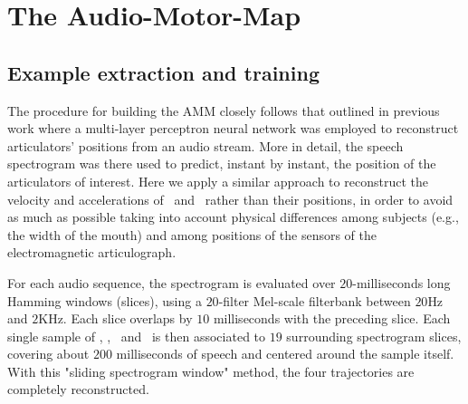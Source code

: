 \section{The Audio-Motor-Map}
\label{sec:rec}

\subsection{Example extraction and training}
\label{subsec:amm_setup}

The procedure for building the AMM closely follows that outlined in previous
work \cite{papcun,richmond,richmond2007} where a multi-layer perceptron
neural network was employed to reconstruct articulators' positions from an
audio stream. More in detail, the speech spectrogram was there used to predict,
instant by instant, the position of the articulators of interest. Here we apply
a similar approach to reconstruct the velocity and accelerations of \lio\ and \ttu\ 
rather than their positions, in order to avoid as much as possible taking into account
physical differences among subjects (e.g., the width of the mouth) and among
positions of the sensors of the electromagnetic articulograph.

For each audio sequence, the spectrogram is evaluated
over $20$-milliseconds long Hamming windows (slices), using a $20$-filter
Mel-scale filterbank between $20$Hz and $2$KHz. Each slice overlaps by $10$ milliseconds with
the preceding slice. Each single sample of \vlio, \alio, \vttu\ and \attu\ is
then associated to $19$ surrounding spectrogram slices, covering
about $200$ milliseconds of speech and centered around the sample itself. With this
"sliding spectrogram window" method, the four trajectories are completely reconstructed.



